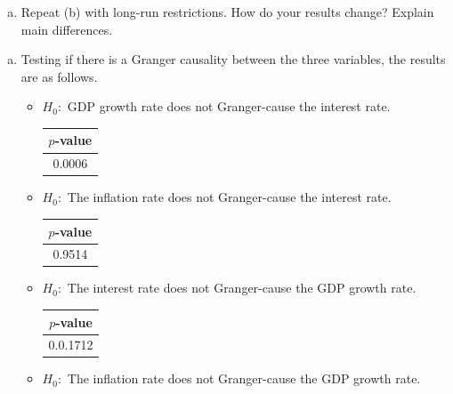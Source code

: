 \documentclass[answers]{exam}
\begin{document}
\begin{questions}
\begin{enumerate}[(a)]
        \item Repeat (b) with long-run restrictions. How do your results change? Explain main differences.
    \end{enumerate}
    \begin{solution}
        \begin{enumerate}[(a)]
            \item Testing if there is a Granger causality between the three variables, the results are as follows.
            \begin{itemize}
                \item $H_{0}:$ GDP growth rate does not Granger-cause the interest rate.
                \begin{center}
                  \begin{tabular}{*1c}
                    \toprule
                    $p$-value\\
                    \midrule
                    0.0006\\
                    \bottomrule
                  \end{tabular}
                \end{center}
                \item $H_{0}: $ The inflation rate does not Granger-cause the interest rate.
                \begin{center}
                  \begin{tabular}{*1c}
                    \toprule
                    $p$-value\\
                    \midrule
                    0.9514\\
                    \bottomrule
                  \end{tabular}
                \end{center}
                \item $H_{0}: $ The interest rate does not Granger-cause the GDP growth rate.
                \begin{center}
                  \begin{tabular}{*1c}
                    \toprule
                    $p$-value\\
                    \midrule
                    0.0.1712\\
                    \bottomrule
                  \end{tabular}
                \end{center}
                \item $H_{0}: $ The inflation rate does not Granger-cause the GDP growth rate.

\end{itemize}
\end{enumerate}
\end{solution}
\end{questions}
\end{document}
